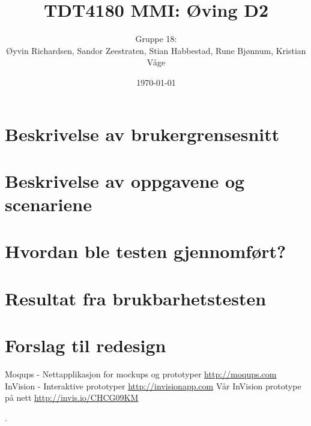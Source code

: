 \documentclass[a4paper,11pt]{article}
\title{TDT4180 MMI: Øving D2}
\author{Gruppe 18: \\ Øyvin Richardsen, Sandor Zeestraten, Stian Habbestad, Rune Bjønnum, Kristian Våge}
\date{\today}
\begin{document}
\maketitle

\tableofcontents

\newpage

\section{Beskrivelse av brukergrensesnitt}


\section{Beskrivelse av oppgavene og scenariene}


\section{Hvordan ble testen gjennomført?}


\section{Resultat fra brukbarhetstesten}


\section{Forslag til redesign}


\footnotesize{  %
\begin{thebibliography}{N}
 Moqups - Nettapplikasjon for mockups og prototyper \url{http://moqups.com}
 InVision - Interaktive prototyper \url{http://invisionapp.com}
 Vår InVision prototype på nett \url{http://invis.io/CHCG09KM}

\end{thebibliography}.  
}




\end{document}
